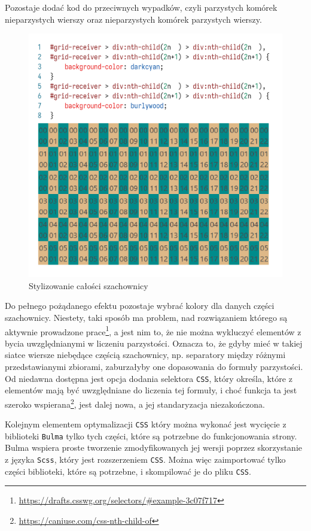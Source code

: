 \documentclass[licencjacka]{pracadypl}
\begin{document}
Pozostaje dodać kod do przeciwnych wypadków, czyli parzystych komórek nieparzystych wierszy oraz nieparzystych komórek parzystych wierszy.

\begin{figure}[H]
  \centering
  \includegraphics[width=\linewidth/\real{1.6}]{images/codeui-checkerboard-coloring.png}
  \caption{Stylizowanie całości szachownicy}
  \label{fig:codeui-checkerboard-coloring}
\end{figure}

Do pełnego pożądanego efektu pozostaje wybrać kolory dla danych części szachownicy. Niestety, taki sposób ma problem, nad rozwiązaniem którego są aktywnie prowadzone prace\footnote{\url{https://drafts.csswg.org/selectors/\#example-3c07f717}}, a jest nim to, że nie można wykluczyć elementów z bycia uwzględnianymi w liczeniu parzystości. Oznacza to, że gdyby mieć w takiej siatce wiersze niebędące częścią szachownicy, np. separatory między różnymi przedstawianymi zbiorami, zaburzałyby one dopasowania do formuły parzystości. Od niedawna dostępna jest opcja dodania selektora \texttt{CSS}, który określa, które z elementów mają być uwzględniane do liczenia tej formuły, i choć funkcja ta jest szeroko wspierana\footnote{\url{https://caniuse.com/css-nth-child-of}}, jest dalej nowa, a jej standaryzacja niezakończona.

Kolejnym elementem optymalizacji \texttt{CSS} który można wykonać jest wycięcie z biblioteki \texttt{Bulma} tylko tych części, które są potrzebne do funkcjonowania strony. Bulma wspiera proste tworzenie zmodyfikowanych jej wersji poprzez skorzystanie z języka \texttt{Scss}, który jest rozszerzeniem \texttt{CSS}. Można więc zaimportować tylko części biblioteki, które są potrzebne, i skompilować je do pliku \texttt{CSS}.
\end{document}
